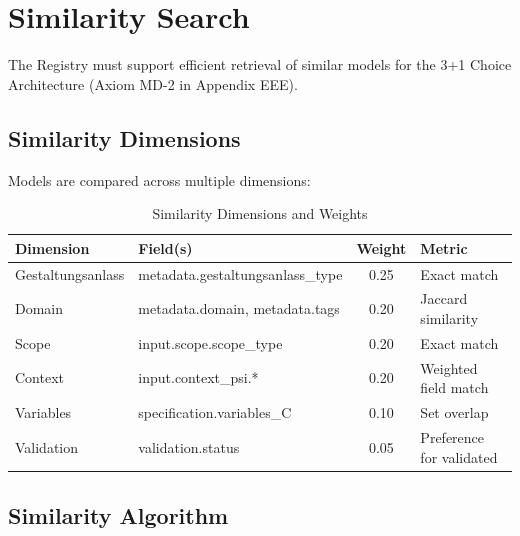\section{Similarity Search}
\label{sec:fff-similarity}

The Registry must support efficient retrieval of similar models for the 3+1
Choice Architecture (Axiom MD-2 in Appendix EEE).

\subsection{Similarity Dimensions}

Models are compared across multiple dimensions:

\begin{table}[htbp]
\centering
\caption{Similarity Dimensions and Weights}
\label{tab:fff-similarity}
\renewcommand{\arraystretch}{1.3}
\begin{tabular}{@{}llcl@{}}
\toprule
\textbf{Dimension} & \textbf{Field(s)} & \textbf{Weight} & \textbf{Metric} \\
\midrule
Gestaltungsanlass & metadata.gestaltungsanlass\_type & 0.25 & Exact match \\
Domain & metadata.domain, metadata.tags & 0.20 & Jaccard similarity \\
Scope & input.scope.scope\_type & 0.20 & Exact match \\
Context & input.context\_psi.* & 0.20 & Weighted field match \\
Variables & specification.variables\_C & 0.10 & Set overlap \\
Validation & validation.status & 0.05 & Preference for validated \\
\bottomrule
\end{tabular}
\end{table}

\subsection{Similarity Algorithm}

